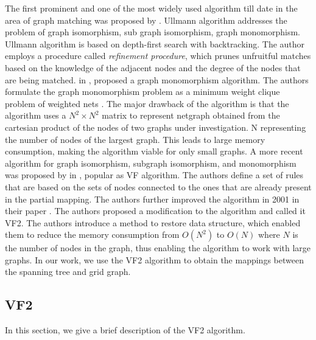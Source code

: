 The first prominent and one of the most widely used algorithm till date in the area of graph matching was proposed by \citeauthor{Ullmann:1976:ASI:321921.321925} \cite{Ullmann:1976:ASI:321921.321925}.
Ullmann algorithm addresses the problem of graph isomorphism, sub graph isomorphism, graph monomorphism. Ullmann algorithm is based on  depth-first search with backtracking.
The author employs a procedure called \textit{refinement procedure}, which prunes unfruitful matches based on the knowledge of the adjacent nodes and the degree of the nodes that are being matched.
\citeauthor{4308468} in \cite{4308468}, proposed a graph monomorphism algorithm.
The authors formulate the graph monomorphism problem as a minimum weight clique problem of weighted nets .
The major drawback of the algorithm is that the algorithm uses a $N^2 \times N^2$ matrix to represent netgraph obtained from the cartesian product of the nodes of two graphs under investigation.
N representing the number of nodes of the largest graph. This leads to large memory consumption, making the algorithm viable for only small graphs.
A more recent algorithm for graph isomorphism, subgraph isomorphism, and monomorphism was proposed by \citeauthor{906251} in \cite{906251}, popular as VF algorithm. 
The authors define a set of rules that are based on the sets of nodes connected to the ones that are already present in the partial mapping.
The authors further improved the algorithm in 2001 in their paper \cite{cordella2001improved}. 
The authors proposed a modification to the algorithm and called it VF2.
The authors introduce a method to restore data structure, which enabled them to reduce the memory consumption from $O(N^2)$ to $O(N)$ where $N$ is the number of nodes in the graph, thus enabling the algorithm to work with large graphs.
In our work, we use the VF2 algorithm to obtain the mappings between the spanning tree and grid graph.

\subsection{VF2}

In this section, we give a brief description of the VF2 algorithm.

